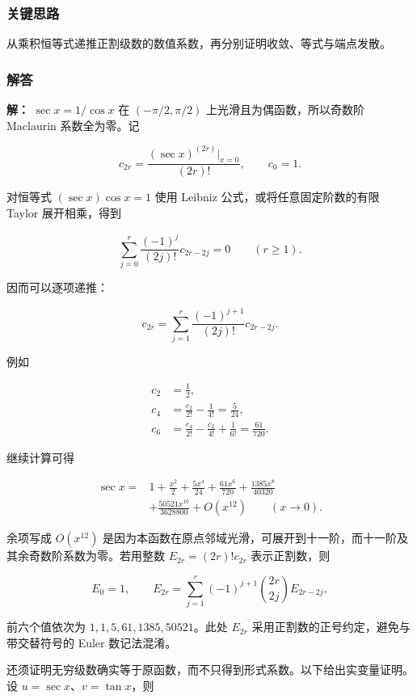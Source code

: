\documentclass[11pt,a4paper]{article}
\begin{document}
\subsubsection{关键思路}\label{ux5173ux952eux601dux8def-25}

从乘积恒等式递推正割级数的数值系数，再分别证明收敛、等式与端点发散。

\subsubsection{解答}\label{ux89e3ux7b54-25}

\textbf{解：} \(\sec x=1/\cos x\) 在 \((-\pi/2,\pi/2)\)
上光滑且为偶函数，所以奇数阶 Maclaurin 系数全为零。记

\[
c_{2r}=\frac{(\sec x)^{(2r)}\big|_{x=0}}{(2r)!},\qquad c_0=1.
\]

对恒等式 \((\sec x)\cos x=1\) 使用 Leibniz 公式，或将任意固定阶数的有限
Taylor 展开相乘，得到

\[
\sum_{j=0}^{r}\frac{(-1)^j}{(2j)!}c_{2r-2j}=0\qquad(r\ge1).
\]

因而可以逐项递推：

\[
c_{2r}=\sum_{j=1}^{r}\frac{(-1)^{j+1}}{(2j)!}c_{2r-2j}.
\]

例如

\[
\begin{aligned}
c_2&=\frac12,\\
c_4&=\frac{c_2}{2!}-\frac1{4!}=\frac5{24},\\
c_6&=\frac{c_4}{2!}-\frac{c_2}{4!}+\frac1{6!}=\frac{61}{720}.
\end{aligned}
\]

继续计算可得

\[
\begin{aligned}
\sec x={}&1+\frac{x^2}{2}+\frac{5x^4}{24}
+\frac{61x^6}{720}+\frac{1385x^8}{40320}\\
&+\frac{50521x^{10}}{3628800}+O(x^{12})\qquad(x\to0).
\end{aligned}
\]

余项写成 \(O(x^{12})\)
是因为本函数在原点邻域光滑，可展开到十一阶，而十一阶及其余奇数阶系数为零。若用整数
\(E_{2r}=(2r)!c_{2r}\) 表示正割数，则

\[
E_0=1,\qquad
E_{2r}=\sum_{j=1}^{r}(-1)^{j+1}\binom{2r}{2j}E_{2r-2j},
\]

前六个值依次为 \(1,1,5,61,1385,50521\)。此处 \(E_{2r}\)
采用正割数的正号约定，避免与带交替符号的 Euler 数记法混淆。

还须证明无穷级数确实等于原函数，而不只得到形式系数。以下给出实变量证明。设
\(u=\sec x\)、\(v=\tan x\)，则
\end{document}
